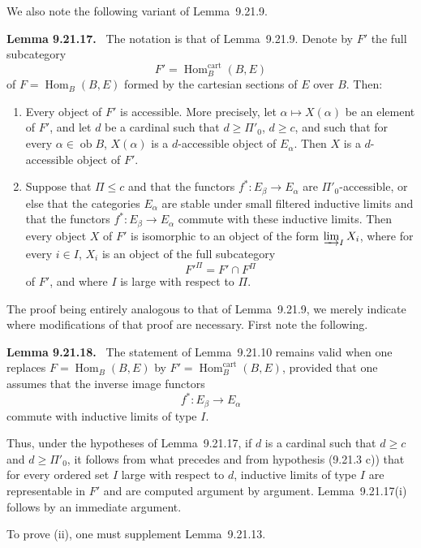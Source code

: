 \documentclass[11pt]{article}
\newcommand{\ob}{\operatorname{ob}}
\newcommand{\Hhom}{\operatorname{Hom}}
\newcommand{\Hhomcart}{\operatorname{Hom}^{\mathrm{cart}}}
\newenvironment{statement}[1]{\par\medskip\noindent\textbf{#1.}\ }{\par\medskip}
\begin{document}
We also note the following variant of Lemma~9.21.9.

\begin{statement}{Lemma 9.21.17}
The notation is that of Lemma~9.21.9. Denote by $F'$ the full subcategory
\[
 F'=\Hhomcart_B(B,E)
\]
of $F=\Hhom_B(B,E)$ formed by the cartesian sections of $E$ over $B$. Then:
\begin{enumerate}[label=(\roman*)]
\item Every object of $F'$ is accessible. More precisely, let $\alpha\mapsto X(\alpha)$ be an element of $F'$, and let $d$ be a cardinal such that $d\geq\Pi'_0$, $d\geq c$, and such that for every $\alpha\in\ob B$, $X(\alpha)$ is a $d$-accessible object of $E_\alpha$. Then $X$ is a $d$-accessible object of $F'$.
\item Suppose that $\Pi\leq c$ and that the functors $f^\ast:E_\beta\to E_\alpha$ are $\Pi'_0$-accessible, or else that the categories $E_\alpha$ are stable under small filtered inductive limits and that the functors $f^\ast:E_\beta\to E_\alpha$ commute with these inductive limits. Then every object $X$ of $F'$ is isomorphic to an object of the form $\varinjlim_I X_i$, where for every $i\in I$, $X_i$ is an object of the full subcategory
\[
 {F'}^\Pi=F'\cap F^\Pi
\]
of $F'$, and where $I$ is large with respect to $\Pi$.
\end{enumerate}
\end{statement}

The proof being entirely analogous to that of Lemma~9.21.9, we merely indicate where modifications of that proof are necessary. First note the following.

\begin{statement}{Lemma 9.21.18}
The statement of Lemma~9.21.10 remains valid when one replaces $F=\Hhom_B(B,E)$ by $F'=\Hhomcart_B(B,E)$, provided that one assumes that the inverse image functors
\[
 f^\ast:E_\beta\longrightarrow E_\alpha
\]
commute with inductive limits of type $I$.
\end{statement}

Thus, under the hypotheses of Lemma~9.21.17, if $d$ is a cardinal such that $d\geq c$ and $d\geq\Pi'_0$, it follows from what precedes and from hypothesis (9.21.3 c)) that for every ordered set $I$ large with respect to $d$, inductive limits of type $I$ are representable in $F'$ and are computed argument by argument. Lemma~9.21.17(i) follows by an immediate argument.

To prove (ii), one must supplement Lemma~9.21.13.
\end{document}

